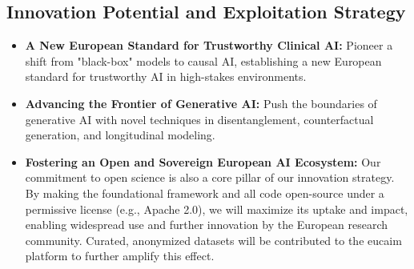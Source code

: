 \documentclass[11pt, a4paper]{article}
\begin{document}
\subsection{Innovation Potential and Exploitation Strategy}
\begin{itemize}
    \item \textbf{A New European Standard for Trustworthy Clinical AI:} Pioneer a shift from "black-box" models to causal AI, establishing a new European standard for trustworthy AI in high-stakes environments.
    \item \textbf{Advancing the Frontier of Generative AI:} Push the boundaries of generative AI with novel techniques in disentanglement, counterfactual generation, and longitudinal modeling.
    \item \textbf{Fostering an Open and Sovereign European AI Ecosystem:} Our commitment to open science is also a core pillar of our innovation strategy. By making the foundational framework and all code open-source under a permissive license (e.g., Apache 2.0), we will maximize its uptake and impact, enabling widespread use and further innovation by the European research community. Curated, anonymized datasets will be contributed to the \gls{eucaim} platform to further amplify this effect.
\end{itemize}
\end{document}

